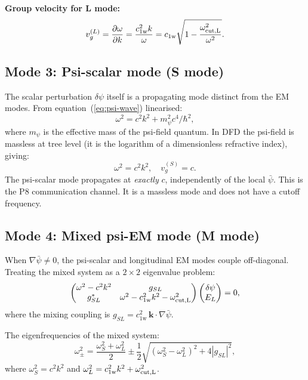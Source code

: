 \documentclass[11pt]{article}
\newcommand{\kvec}{\mathbf{k}}
\newcommand{\cfield}{c_{1\mathrm{w}}}
\newcommand{\vgL}{v_g^{(L)}}
\newcommand{\psibar}{\bar{\psi}}
\begin{document}
\textbf{Group velocity for L mode:}
\begin{equation}
\vgL = \frac{\partial\omega}{\partial k} = \frac{\cfield^2 k}{\omega}
= \cfield\sqrt{1 - \frac{\omega_{\rm cut,L}^2}{\omega^2}}.
\label{eq:vgL}
\end{equation}

\subsection{Mode 3: Psi-scalar mode (S mode)}

The scalar perturbation $\delta\psi$ itself is a propagating mode distinct from the
EM modes. From equation~(\ref{eq:psi-wave}) linearised:
\begin{equation}
\omega^2 = c^2 k^2 + m_\psi^2 c^4/\hbar^2,
\label{eq:disp-S}
\end{equation}
where $m_\psi$ is the effective mass of the psi-field quantum. In DFD the
psi-field is massless at tree level (it is the logarithm of a dimensionless
refractive index), giving:
\begin{equation}
\omega^2 = c^2 k^2,
\quad v_g^{(S)} = c.
\label{eq:disp-S-massless}
\end{equation}
The psi-scalar mode propagates at \emph{exactly} $c$, independently of the local
$\psibar$. This is the P8 communication channel. It is a massless mode and does
not have a cutoff frequency.

\subsection{Mode 4: Mixed psi-EM mode (M mode)}

When $\nabla\psibar \neq 0$, the psi-scalar and longitudinal EM modes couple
off-diagonal. Treating the mixed system as a $2\times 2$ eigenvalue problem:
\begin{equation}
\begin{pmatrix}
\omega^2 - c^2 k^2 & g_{SL} \\
g_{SL}^* & \omega^2 - \cfield^2 k^2 - \omega_{\rm cut,L}^2
\end{pmatrix}
\begin{pmatrix} \delta\psi \\ E_L \end{pmatrix} = 0,
\label{eq:mixing-matrix}
\end{equation}
where the mixing coupling is $g_{SL} = \cfield^2\,\kvec\cdot\nabla\psibar$.

The eigenfrequencies of the mixed system:
\begin{equation}
\omega_{\pm}^2 = \frac{\omega_S^2 + \omega_L^2}{2}
\pm \frac{1}{2}\sqrt{(\omega_S^2 - \omega_L^2)^2 + 4|g_{SL}|^2},
\label{eq:mixed-eigen}
\end{equation}
where $\omega_S^2 = c^2 k^2$ and $\omega_L^2 = \cfield^2 k^2 + \omega_{\rm cut,L}^2$.
\end{document}

